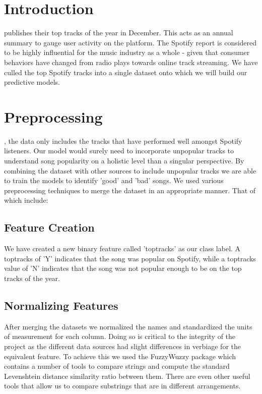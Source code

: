 \documentclass[12pt,journal]{IEEEtran}
\begin{document}
\section{Introduction}
 publishes their top tracks of the year in December. This acts as an annual summary to gauge user activity on the platform. The Spotify report is considered to be highly influential for the music industry as a whole - given that consumer behaviors have changed from radio plays towards online track streaming. We have culled the top Spotify tracks into a single dataset onto which we will build our predictive models.

\section{Preprocessing}
, the data only includes the tracks that have performed well amongst Spotify listeners. Our model would surely need to incorporate unpopular tracks to understand song popularity on a holistic level than a singular perspective. By combining the dataset with other sources to include unpopular tracks we are able to train the models to identify 'good' and 'bad' songs. We used various preprocessing techniques to merge the dataset in an appropriate manner. That of which include:


\subsection{Feature Creation}
We have created a new binary feature called 'toptracks' as our class label. A toptracks of 'Y' indicates that the song was popular on Spotify, while a toptracks value of 'N' indicates that the song was not popular enough to be on the top tracks of the year.

\subsection{Normalizing Features}
After merging the datasets we normalized the names and standardized the units of measurement for each column. Doing so is critical to the integrity of the project as the different data sources had slight differences in verbiage for the equivalent feature. To achieve this we used the FuzzyWuzzy package which contains a number of tools to compare strings and compute the standard Levenshtein distance similarity ratio between them. There are even other useful tools that allow us to compare substrings that are in different arrangements. 
\end{document}
